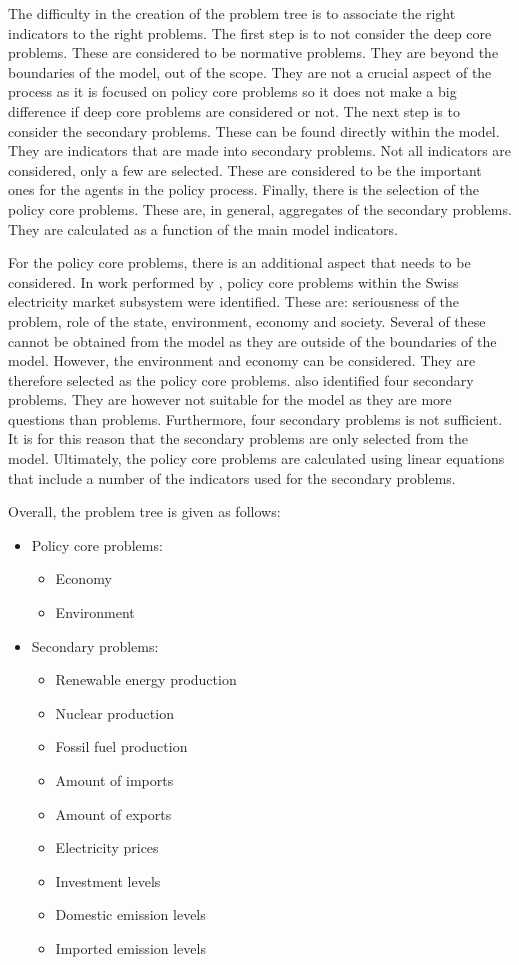 The difficulty in the creation of the problem tree is to associate the right indicators to the right problems. The first step is to not consider the deep core problems. These are considered to be normative problems. They are beyond the boundaries of the model, out of the scope. They are not a crucial aspect of the process as it is focused on policy core problems so it does not make a big difference if deep core problems are considered or not. The next step is to consider the secondary problems. These can be found directly within the model. They are indicators that are made into secondary problems. Not all indicators are considered, only a few are selected. These are considered to be the important ones for the agents in the policy process. Finally, there is the selection of the policy core problems. These are, in general, aggregates of the secondary problems. They are calculated as a function of the main model indicators.

For the policy core problems, there is an additional aspect that needs to be considered. In work performed by \citeauthor{markard2016socio}, policy core problems within the Swiss electricity market subsystem were identified. These are: seriousness of the problem, role of the state, environment, economy and society. Several of these cannot be obtained from the model as they are outside of the boundaries of the model. However, the environment and economy can be considered. They are therefore selected as the policy core problems. \cite{markard2016socio} also identified four secondary problems. They are however not suitable for the model as they are more questions than problems. Furthermore, four secondary problems is not sufficient. It is for this reason that the secondary problems are only selected from the model. Ultimately, the policy core problems are calculated using linear equations that include a number of the indicators used for the secondary problems.

Overall, the problem tree is given as follows:

\begin{itemize}
\item Policy core problems:
	\begin{itemize}
	\item Economy
	\item Environment
	\end{itemize}
\item Secondary problems:
	\begin{itemize}
	\item Renewable energy production
	\item Nuclear production
	\item Fossil fuel production
	\item Amount of imports
	\item Amount of exports
	\item Electricity prices
	\item Investment levels
	\item Domestic emission levels
	\item Imported emission levels
	\end{itemize}
\end{itemize}

